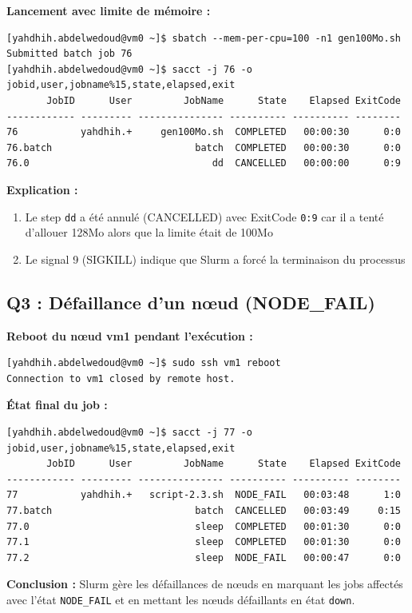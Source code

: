 \documentclass[12pt,a4paper]{article}
\newcommand{\code}[1]{\texttt{#1}}
\begin{document}
\textbf{Lancement avec limite de mémoire :}
\begin{lstlisting}
[yahdhih.abdelwedoud@vm0 ~]$ sbatch --mem-per-cpu=100 -n1 gen100Mo.sh
Submitted batch job 76
[yahdhih.abdelwedoud@vm0 ~]$ sacct -j 76 -o jobid,user,jobname%15,state,elapsed,exit
       JobID      User         JobName      State    Elapsed ExitCode 
------------ --------- --------------- ---------- ---------- -------- 
76           yahdhih.+     gen100Mo.sh  COMPLETED   00:00:30      0:0 
76.batch                         batch  COMPLETED   00:00:30      0:0 
76.0                                dd  CANCELLED   00:00:00      0:9 
\end{lstlisting}

\textbf{Explication :}
\begin{enumerate}
    \item Le step \code{dd} a été annulé (CANCELLED) avec ExitCode \code{0:9} car il a tenté d'allouer 128Mo alors que la limite était de 100Mo
    \item Le signal 9 (SIGKILL) indique que Slurm a forcé la terminaison du processus
\end{enumerate}

\subsection{Q3 : Défaillance d'un nœud (NODE\_FAIL)}

\textbf{Reboot du nœud vm1 pendant l'exécution :}
\begin{lstlisting}
[yahdhih.abdelwedoud@vm0 ~]$ sudo ssh vm1 reboot
Connection to vm1 closed by remote host.
\end{lstlisting}

\textbf{État final du job :}
\begin{lstlisting}
[yahdhih.abdelwedoud@vm0 ~]$ sacct -j 77 -o jobid,user,jobname%15,state,elapsed,exit
       JobID      User         JobName      State    Elapsed ExitCode 
------------ --------- --------------- ---------- ---------- -------- 
77           yahdhih.+   script-2.3.sh  NODE_FAIL   00:03:48      1:0 
77.batch                         batch  CANCELLED   00:03:49     0:15 
77.0                             sleep  COMPLETED   00:01:30      0:0 
77.1                             sleep  COMPLETED   00:01:30      0:0 
77.2                             sleep  NODE_FAIL   00:00:47      0:0 
\end{lstlisting}

\textbf{Conclusion :} Slurm gère les défaillances de nœuds en marquant les jobs affectés avec l'état \code{NODE\_FAIL} et en mettant les nœuds défaillants en état \code{down}.
\end{document}
